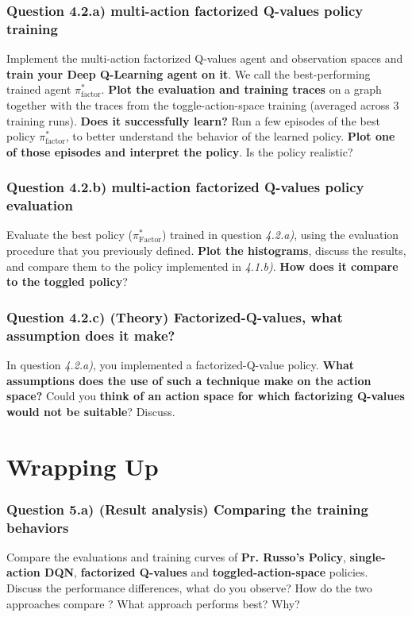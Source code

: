 \documentclass[10pt]{article}
\begin{document}
\subsubsection*{Question 4.2.a) multi-action factorized Q-values policy training}
Implement the multi-action factorized Q-values agent and observation spaces and \textbf{train your Deep Q-Learning agent on it}.
We call the best-performing trained agent $\pi_\text{factor}^*$.
\textbf{Plot the evaluation and training traces} on a graph together with the traces from the toggle-action-space training (averaged across $3$ training runs).
\textbf{Does it successfully learn?}
Run a few episodes of the best policy $\pi^*_\text{factor}$, to better understand the behavior of the learned policy.
\textbf{Plot one of those episodes and interpret the policy}. Is the policy realistic?


\subsubsection*{Question 4.2.b) multi-action factorized Q-values policy evaluation}
Evaluate the best policy ($\pi_\text{Factor}^*$) trained in question \textit{4.2.a)}, using the evaluation procedure that you previously defined. \textbf{Plot the histograms}, discuss the results, and compare them to the policy implemented in \textit{4.1.b)}. \textbf{How does it compare to the toggled policy}?


\subsubsection*{Question 4.2.c) (Theory) Factorized-Q-values, what assumption does it make?}

In question \textit{4.2.a)}, you implemented a factorized-Q-value policy.
\textbf{What assumptions does the use of such a technique make on the action space?}
Could you \textbf{think of an action space for which factorizing Q-values would not be suitable}? Discuss.

\section{Wrapping Up}

\subsubsection*{Question 5.a) (Result analysis) Comparing the training behaviors}

Compare the evaluations and training curves of \textbf{Pr. Russo's Policy}, \textbf{single-action DQN}, \textbf{factorized Q-values} and \textbf{toggled-action-space} policies. Discuss the performance differences, what do you observe? How do the two approaches compare ? What approach performs best? Why?
\end{document}
